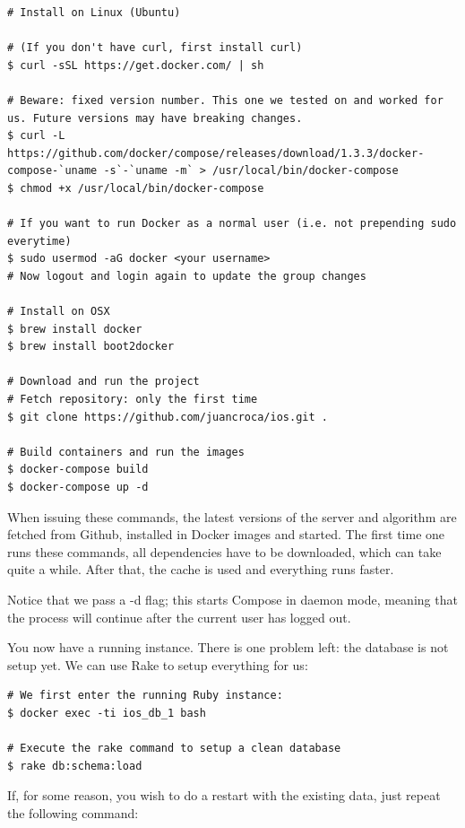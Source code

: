 \begin{verbatim}
# Install on Linux (Ubuntu)

# (If you don't have curl, first install curl)
$ curl -sSL https://get.docker.com/ | sh

# Beware: fixed version number. This one we tested on and worked for us. Future versions may have breaking changes.
$ curl -L https://github.com/docker/compose/releases/download/1.3.3/docker-compose-`uname -s`-`uname -m` > /usr/local/bin/docker-compose 
$ chmod +x /usr/local/bin/docker-compose

# If you want to run Docker as a normal user (i.e. not prepending sudo everytime)
$ sudo usermod -aG docker <your username>
# Now logout and login again to update the group changes

# Install on OSX
$ brew install docker
$ brew install boot2docker

# Download and run the project
# Fetch repository: only the first time
$ git clone https://github.com/juancroca/ios.git .

# Build containers and run the images
$ docker-compose build
$ docker-compose up -d
\end{verbatim}


When issuing these commands, the latest versions of the server and algorithm are fetched from Github, installed in Docker images and started. The first time one runs these commands, all dependencies have to be downloaded, which can take quite a while. After that, the cache is used and everything runs faster.

Notice that we pass a -d flag; this starts Compose in daemon mode, meaning that the process will continue after the current user has logged out.

You now have a running instance. There is one problem left: the database is not setup yet. We can use Rake to setup everything for us:

\begin{verbatim}
# We first enter the running Ruby instance:
$ docker exec -ti ios_db_1 bash

# Execute the rake command to setup a clean database
$ rake db:schema:load
\end{verbatim}

If, for some reason, you wish to do a restart with the existing data, just repeat the following command:

